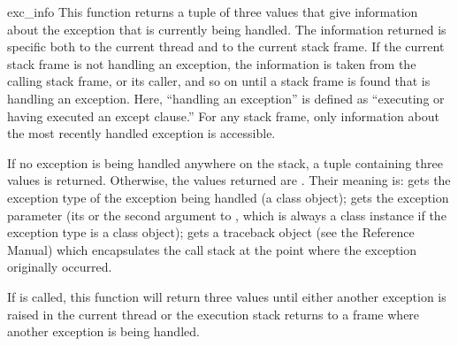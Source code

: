 \begin{funcdesc}{exc_info}{}
  This function returns a tuple of three values that give information
  about the exception that is currently being handled.  The
  information returned is specific both to the current thread and to
  the current stack frame.  If the current stack frame is not handling
  an exception, the information is taken from the calling stack frame,
  or its caller, and so on until a stack frame is found that is
  handling an exception.  Here, ``handling an exception'' is defined
  as ``executing or having executed an except clause.''  For any stack
  frame, only information about the most recently handled exception is
  accessible.

  If no exception is being handled anywhere on the stack, a tuple
  containing three  values is returned.  Otherwise, the
  values returned are .  Their meaning is:  gets the exception
  type of the exception being handled (a class object);
   gets the exception parameter (its 
  or the second argument to , which is always a class
  instance if the exception type is a class object); 
  gets a traceback object (see the Reference Manual) which
  encapsulates the call stack at the point where the exception
  originally occurred.  

  If  is called, this function will return three
   values until either another exception is raised in the
  current thread or the execution stack returns to a frame where
  another exception is being handled.

   
\end{funcdesc}

